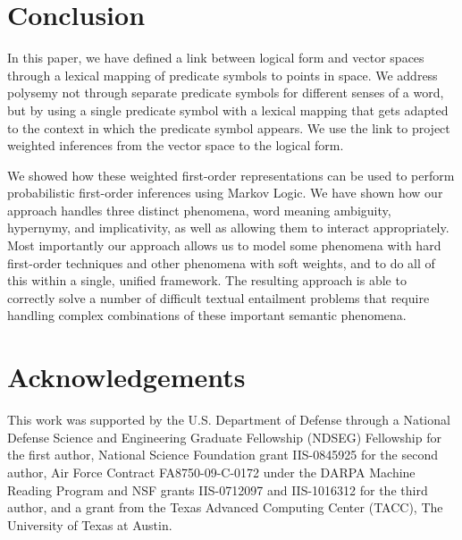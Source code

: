 \section{Conclusion}

In this paper, we have defined a link between logical form and vector
spaces through a lexical mapping of predicate symbols to points in
space. We address polysemy not through separate predicate symbols for
different senses of a word, but by using a single predicate symbol
with a lexical mapping that gets
adapted to the context in which the predicate symbol appears. We use
the link to project weighted inferences from the vector space to the
logical form. 

We showed how these weighted first-order
representations can be used to perform probabilistic first-order inferences
using Markov Logic.  We have shown how our approach handles three distinct
phenomena, word meaning ambiguity, hypernymy, and implicativity, as well as
allowing them to interact appropriately.  Most importantly our approach allows 
us to model some phenomena with hard first-order techniques and
other phenomena with soft weights, and to do all of this within a
single, unified framework.
The resulting approach is able to correctly solve a number of difficult
textual entailment problems that require handling complex combinations of these
important semantic phenomena.




\section*{Acknowledgements}

This work was supported by the U.S. Department of Defense through a National
Defense Science and Engineering Graduate Fellowship (NDSEG) Fellowship for the
first author, National Science Foundation grant IIS-0845925 for the second
author, Air Force Contract FA8750-09-C-0172 under the DARPA Machine Reading
Program and NSF grants IIS-0712097 and IIS-1016312 for the third author, and a
grant from the Texas Advanced Computing Center (TACC), The University of Texas
at Austin.
